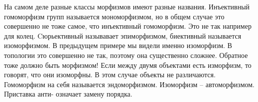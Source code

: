 На самом деле разные классы морфизмов имеют разные названия. Инъективный
гомоморфизм групп называется мономорфизмом, но в общем случае это совершенно
не тоже самое, что инъективный гомоморфизм. Это не так например для колец.
Cюрьективный называвает эпиморфизмом, биективный называется изоморфизмом. В
предыдущем примере мы видели именно изоморфизм. В топологии это совершенно не
так, поэтому она существенно сложнее. Обратное тоже должно быть морфизмом! Если
между двумя объектами есть изморфизм, то говорят, что они изоморфны. В этом
случае объекты не различаются. Гомоморфизм на себя называется эндоморфизмом.
Изоморфизм – автоморфизмом. Приставка анти- означает замену порядка.
